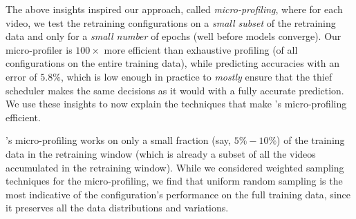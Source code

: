 

The above insights inspired our approach, called {\em micro-profiling}, where 
for each video, we test the retraining configurations on a {\em small subset} of the retraining data and only for a {\em small number} of epochs (well before models converge). %
Our micro-profiler is $100\times$ more efficient than exhaustive profiling (of all configurations on the entire training data), while predicting accuracies with an error of $5.8\%$, %
which is low enough in practice to {\em mostly} ensure that the thief scheduler makes the same decisions as it would with a fully accurate prediction. %
We use these insights to now explain the techniques that make {\name}'s micro-profiling efficient.



{\name}'s micro-profiling works on only a small fraction (say, $5\%-10\%$) of the training data in the retraining window (which is already a subset of all the videos accumulated in the retraining window). While we considered weighted sampling techniques for the micro-profiling, we find that uniform random sampling is the most indicative of the configuration's performance on the full training data, since it preserves all the data distributions and variations. %

